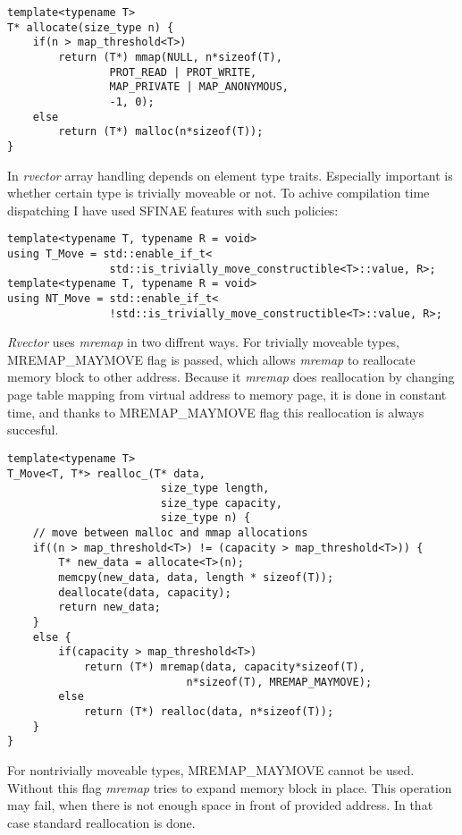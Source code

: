 \documentclass[inz, english, shortabstract]{iithesis}
\begin{document}
\begin{lstlisting}[caption=rvector allocation]
template<typename T>
T* allocate(size_type n) {
	if(n > map_threshold<T>)
    	return (T*) mmap(NULL, n*sizeof(T), 
                PROT_READ | PROT_WRITE,
                MAP_PRIVATE | MAP_ANONYMOUS,
                -1, 0);
    else
    	return (T*) malloc(n*sizeof(T));
}
\end{lstlisting}
In {\it rvector} array handling depends on element type traits. Especially important is whether certain type is trivially moveable or not. To achive compilation time dispatching I have used SFINAE features with such policies:

\begin{lstlisting}[caption=SFINAE policies]
template<typename T, typename R = void>
using T_Move = std::enable_if_t<
				std::is_trivially_move_constructible<T>::value, R>;
template<typename T, typename R = void>
using NT_Move = std::enable_if_t<
				!std::is_trivially_move_constructible<T>::value, R>;
\end{lstlisting}
{\it Rvector} uses {\it mremap} in two diffrent ways. For trivially moveable types, MREMAP\_MAYMOVE flag is passed, which allows {\it mremap} to reallocate memory block to other address. Because it {\it mremap} does reallocation by changing page table mapping from virtual address to memory page\cite{mremap}, it is done in constant time, and thanks to MREMAP\_MAYMOVE flag this reallocation is always succesful. 

\begin{lstlisting}[caption=rvector trivial type reallocation]
template<typename T>
T_Move<T, T*> realloc_(T* data, 
						size_type length, 
						size_type capacity, 
						size_type n) {
	// move between malloc and mmap allocations
	if((n > map_threshold<T>) != (capacity > map_threshold<T>)) {
        T* new_data = allocate<T>(n);
        memcpy(new_data, data, length * sizeof(T));
        deallocate(data, capacity);
        return new_data;
    }
    else {
        if(capacity > map_threshold<T>)
        	return (T*) mremap(data, capacity*sizeof(T), 
                    		n*sizeof(T), MREMAP_MAYMOVE);
        else
        	return (T*) realloc(data, n*sizeof(T));
    }
}
\end{lstlisting}
For nontrivially moveable types, MREMAP\_MAYMOVE cannot be used. Without this flag {\it mremap} tries to expand memory block in place. This operation may fail, when there is not enough space in front of provided address. In that case standard reallocation is done.
\end{document}
